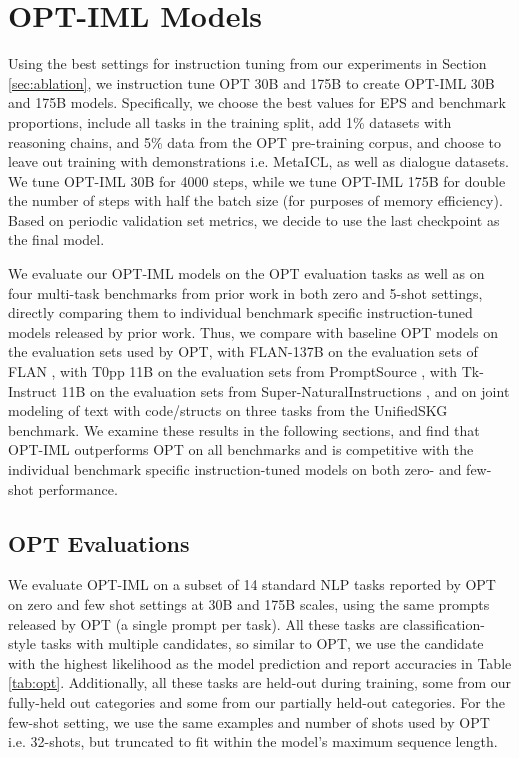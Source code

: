 \section{OPT-IML Models} 
\label{sec:results}

Using the best settings for instruction tuning from our experiments in Section \ref{sec:ablation}, we instruction tune OPT 30B and 175B to create OPT-IML 30B and 175B models. Specifically, we choose the best values for EPS and benchmark proportions, include all tasks in the training split, add 1\% datasets with reasoning chains, and 5\% data from the OPT pre-training corpus, and choose to leave out training with demonstrations i.e. MetaICL, as well as dialogue datasets. We tune OPT-IML 30B for 4000 steps, while we tune OPT-IML 175B for double the number of steps with half the batch size (for purposes of memory efficiency). Based on periodic validation set metrics, we decide to use the last checkpoint as the final model.

We evaluate our OPT-IML models on the OPT evaluation tasks as well as on four multi-task benchmarks from prior work \citep{wei2021flan,sanh2021t0,wang2022niv2,xie2022unifiedskg,zhang2022opt} in both zero and 5-shot settings, directly comparing them to individual benchmark specific instruction-tuned models released by prior work. Thus, we compare with baseline OPT models on the evaluation sets used by OPT, with FLAN-137B on the evaluation sets of FLAN \citep{wei2021flan}, with T0pp 11B on the evaluation sets from PromptSource \citep{sanh2021t0}, with Tk-Instruct 11B on the evaluation sets from Super-NaturalInstructions \citep{wang2022niv2}, and on joint modeling of text with code/structs on three tasks from the UnifiedSKG \citep{xie2022unifiedskg} benchmark. We examine these results in the following sections, and find that OPT-IML outperforms OPT on all benchmarks and is competitive with the individual benchmark specific instruction-tuned models on both zero- and few-shot performance.

\subsection{OPT Evaluations}
\label{sec:opt}

We evaluate OPT-IML on a subset of 14 standard NLP tasks reported by OPT \citep{zhang2022opt} on zero and few shot settings at 30B and 175B scales, using the same prompts released by OPT (a single prompt per task). All these tasks are classification-style tasks with multiple candidates, so similar to OPT, we use the candidate with the highest likelihood as the model prediction and report accuracies in Table \ref{tab:opt}. Additionally, all these tasks are held-out during training, some from our fully-held out categories and some from our partially held-out categories. For the few-shot setting, we use the same examples and number of shots used by OPT i.e. 32-shots, but truncated to fit within the model's maximum sequence length.  


